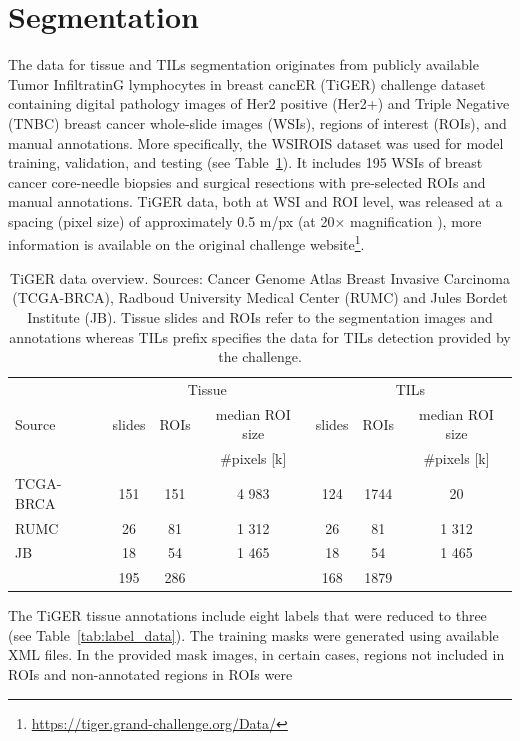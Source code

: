 \section{Segmentation}
The data for tissue and TILs segmentation originates from publicly available
Tumor InfiltratinG lymphocytes in breast cancER (TiGER) challenge dataset containing
digital pathology images of Her2 positive (Her2+) and Triple Negative (TNBC) breast
cancer whole-slide images (WSIs), regions of interest (ROIs), and manual annotations.
More specifically, the WSIROIS dataset was used for model training, validation, and
testing (see Table~\ref*{tab:segm_data}).
It includes 195 WSIs of breast cancer core-needle biopsies and surgical resections with
pre-selected ROIs and manual annotations.
TiGER data, both at WSI and ROI level, was released at a spacing (pixel size) of
approximately 0.5 \textmu m/px (at 20$\times$ magnification ), more information is available on the original
challenge website\footnote{\url{https://tiger.grand-challenge.org/Data/}}.
\begin{table}[h!]
\centering
\begin{tabular}{ l c c c c c c } 
\hline
\multirow{3}{*}{Source} &  \multicolumn{3}{c}{Tissue} & \multicolumn{3}{c}{TILs}\\ 
\cline{2-7}
 & slides & ROIs & median ROI size & slides & ROIs & median ROI size \\ 
  & & & \#pixels [k] & & & \#pixels [k] \\ 
\hline
TCGA-BRCA & 151 & 151 & 4 983 & 124 & 1744 & 20\\ 
RUMC & 26 & 81 & 1 312 & 26 & 81 & 1 312\\ 
JB & 18 & 54 & 1 465 & 18 & 54 & 1 465\\
\hline
 & 195 & 286 & & 168 & 1879 &\\
\end{tabular}
\caption{\label{tab:segm_data}TiGER data overview. Sources: Cancer Genome Atlas Breast Invasive Carcinoma (TCGA-BRCA),
Radboud University Medical Center (RUMC) and Jules Bordet Institute (JB). Tissue slides and ROIs refer to the segmentation
images and annotations whereas TILs prefix specifies the data for TILs detection provided by the challenge. }
\end{table}
The TiGER tissue annotations include eight
labels that were reduced to three (see Table~\ref*{tab:label_data}).
The training masks were generated using available XML files. In the provided mask
images, in certain cases, regions not included in ROIs and non-annotated regions in ROIs were

